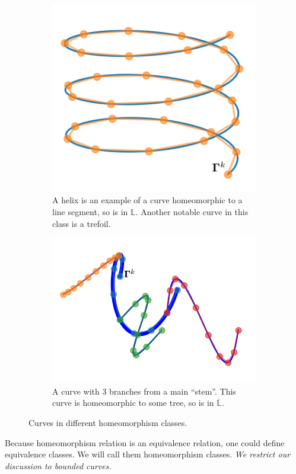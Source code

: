 \documentclass[../dissertation.tex]{subfiles}
\begin{document}
\begin{figure}[tpb]
    \centering
    \begin{subfigure}[b]{0.4\textwidth}
        \centering
        \includegraphics[width=\textwidth]{sections/otherHomeomorphismImgs/linesegment}
        \caption{A helix is an example of a curve homeomorphic to a line segment, so is in $\mathbb{L}$. Another notable curve in this class is a trefoil.}
        \label{fig: Line Segment Homeomorphism Class}
    \end{subfigure}
    \hspace{1cm}
    \begin{subfigure}[b]{0.4\textwidth}
        \centering
        \includegraphics[width=\textwidth]{sections/otherHomeomorphismImgs/branch}
        \caption{A curve with 3 branches from a main ``stem''. This curve is homeomorphic to some tree, so is in $\overline{\mathbb{L}}$.}
        \label{fig: Bus Network}
    \end{subfigure}
    \caption{Curves in different homeomorphism classes.}
\end{figure}
Because homeomorphism relation is an equivalence relation, one could define equivalence classes.
We will call them homeomorphism classes.
\textit{We restrict our discussion to bounded curves.}
\end{document}
